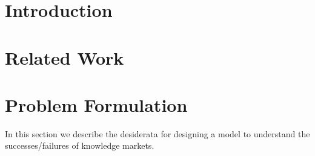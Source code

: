 \documentclass[sigconf]{acmart}
\begin{document}
\iffalse
\begin{abstract}
This paper provides a sample of a \LaTeX\ document which conforms,
somewhat loosely, to the formatting guidelines for
ACM SIG Proceedings.\footnote{This is an abstract footnote}
\end{abstract}

%
%
\begin{CCSXML}
<ccs2012>
 <concept>
  <concept_id>10010520.10010553.10010562</concept_id>
  <concept_desc>Computer systems organization~Embedded systems</concept_desc>
  <concept_significance>500</concept_significance>
 </concept>
 <concept>
  <concept_id>10010520.10010575.10010755</concept_id>
  <concept_desc>Computer systems organization~Redundancy</concept_desc>
  <concept_significance>300</concept_significance>
 </concept>
 <concept>
  <concept_id>10010520.10010553.10010554</concept_id>
  <concept_desc>Computer systems organization~Robotics</concept_desc>
  <concept_significance>100</concept_significance>
 </concept>
 <concept>
  <concept_id>10003033.10003083.10003095</concept_id>
  <concept_desc>Networks~Network reliability</concept_desc>
  <concept_significance>100</concept_significance>
 </concept>
</ccs2012>
\end{CCSXML}

\ccsdesc[500]{Computer systems organization~Embedded systems}
\ccsdesc[300]{Computer systems organization~Redundancy}
\ccsdesc{Computer systems organization~Robotics}
\ccsdesc[100]{Networks~Network reliability}


\keywords{ACM proceedings, \LaTeX, text tagging}
\fi


\maketitle


%


\section{Introduction}

\section{Related Work}

\section{Problem Formulation}
In this section we describe the desiderata for designing a model to understand the successes/failures of knowledge markets.
\end{document}
